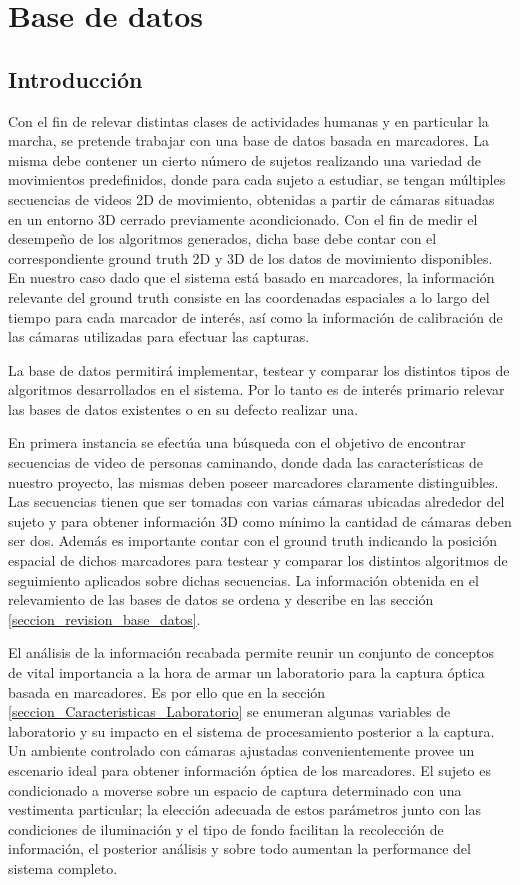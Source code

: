\chapter{Base de datos} \label{section_base_de_datos}


\section{Introducción} 
Con el fin de relevar distintas clases de actividades humanas y en particular la marcha, se pretende trabajar con una base de datos basada en marcadores. La misma debe contener un cierto número de sujetos realizando una variedad de movimientos predefinidos, donde para cada sujeto a estudiar, se tengan múltiples secuencias de videos 2D de movimiento, obtenidas a partir de cámaras situadas en un entorno 3D cerrado previamente acondicionado. Con el fin de medir el desempeño de los algoritmos generados, dicha base debe contar con el correspondiente ground truth 2D y 3D de los datos de movimiento disponibles. En nuestro caso dado que el  sistema está basado en marcadores, la información relevante del ground truth consiste en las coordenadas espaciales a lo largo del tiempo para cada marcador de interés, así como la información de calibración de las cámaras utilizadas para efectuar las capturas.


La base de datos permitirá implementar, testear y comparar los distintos tipos de algoritmos desarrollados en el sistema. Por lo tanto es de interés primario relevar las bases de datos existentes o en su defecto realizar una.


En primera instancia se efectúa una búsqueda con el objetivo de encontrar secuencias de video de personas caminando, donde dada las características de nuestro proyecto, las mismas deben poseer marcadores claramente distinguibles. Las secuencias tienen que ser tomadas con varias cámaras ubicadas alrededor del sujeto y para obtener información 3D como mínimo la cantidad de cámaras deben ser dos. Además es importante contar con el ground truth indicando la posición espacial de dichos marcadores para testear y comparar los distintos algoritmos de seguimiento aplicados sobre dichas secuencias. La información obtenida en el relevamiento de las bases de datos se ordena y describe en las sección \ref{seccion_revision_base_datos}.


El análisis de la información recabada permite reunir un conjunto de conceptos de vital importancia a la hora de armar un laboratorio para la captura óptica basada en marcadores. Es por ello que en la sección \ref{seccion_Caracteristicas_Laboratorio} se enumeran algunas variables de laboratorio y su impacto en el sistema de procesamiento posterior a la captura. Un ambiente controlado con cámaras ajustadas convenientemente provee un escenario ideal para obtener información óptica de los marcadores. El sujeto es condicionado a moverse sobre un espacio de captura determinado con una vestimenta particular; la elección adecuada de estos parámetros junto con las condiciones de iluminación y el tipo de fondo facilitan la recolección de información, el posterior análisis y sobre todo aumentan la performance del sistema completo.




